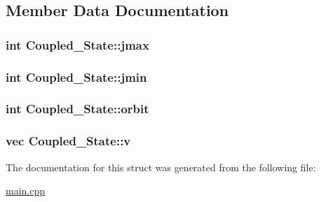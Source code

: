 \subsection{Member Data Documentation}
\hypertarget{struct_coupled___state_a923e8978be136d1c09742c608914a00b}{
\subsubsection[{jmax}]{\setlength{\rightskip}{0pt plus 5cm}int Coupled\-\_\-\-State\-::jmax}}\label{struct_coupled___state_a923e8978be136d1c09742c608914a00b}
\hypertarget{struct_coupled___state_a473ea496bd301f167432a8e61d6487bc}{
\subsubsection[{jmin}]{\setlength{\rightskip}{0pt plus 5cm}int Coupled\-\_\-\-State\-::jmin}}\label{struct_coupled___state_a473ea496bd301f167432a8e61d6487bc}
\hypertarget{struct_coupled___state_a7f995cca6b0a5bb41e30d9723e358887}{
\subsubsection[{orbit}]{\setlength{\rightskip}{0pt plus 5cm}int Coupled\-\_\-\-State\-::orbit}}\label{struct_coupled___state_a7f995cca6b0a5bb41e30d9723e358887}
\hypertarget{struct_coupled___state_a0cf310a6235dd6ff6d140b94717ca735}{
\subsubsection[{v}]{\setlength{\rightskip}{0pt plus 5cm}vec Coupled\-\_\-\-State\-::v}}\label{struct_coupled___state_a0cf310a6235dd6ff6d140b94717ca735}


The documentation for this struct was generated from the following file\-:\begin{DoxyCompactItemize}
\item 
\hyperlink{main_8cpp}{main.\-cpp}\end{DoxyCompactItemize}
